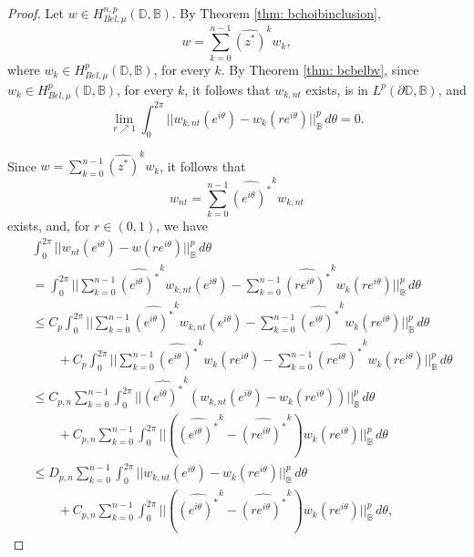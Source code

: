 \documentclass[10pt,a4paper]{amsart}
\newcommand{\bc}{\mathbb{B}}
\newcommand{\disk}{\mathbb{D}}
\newcommand{\p}{\partial}
\begin{document}
\begin{proof}




 Let $w \in H^{n,p}_{Bel,\mu}(\disk,\bc)$. By Theorem \ref{thm: bchoibinclusion}, 
        \[
            w = \sum_{k = 0}^{n-1}  \widehat{(z^*)}^k w_k,
        \]
        where $w_k \in H^p_{Bel,\mu}(\disk,\bc)$, for every $k$. By Theorem \ref{thm: bcbelbv}, since $w_k \in H^p_{Bel,\mu}(\disk,\bc)$, for every $k$, it follows that $w_{k,nt}$ exists, is in $L^p(\p \disk,\bc)$, and 
        \begin{equation}\label{convfork}
            \lim_{r \nearrow 1} \int_0^{2\pi} ||w_{k,nt}(e^{i\theta}) - w_k(re^{i\theta}) ||^p_{\bc} \, d\theta  = 0. 
        \end{equation}

        Since $w = \sum_{k = 0}^{n-1}  \widehat{(z^*)}^k w_k$, it follows that 
        \[
            w_{nt} = \sum_{k = 0}^{n-1}  \widehat{(e^{i\theta})^*}^k w_{k,nt}
        \]
        exists, and, for $r \in (0,1)$, we have
        \begin{align*}
            &\int_0^{2\pi} ||w_{nt}(e^{i\theta}) - w(re^{i\theta}) ||^p_{\bc} \, d\theta \\
            &= \int_0^{2\pi} ||\sum_{k = 0}^{n-1}  \widehat{(e^{i\theta})^*}^k w_{k,nt}(e^{i\theta}) - \sum_{k = 0}^{n-1}  \widehat{(re^{i\theta})^*}^k w_k(re^{i\theta}) ||^p_{\bc} \, d\theta \\
            &\leq C_p \int_0^{2\pi} ||\sum_{k = 0}^{n-1}  \widehat{(e^{i\theta})^*}^k w_{k,nt}(e^{i\theta}) - \sum_{k = 0}^{n-1}  \widehat{(e^{i\theta})^*}^k w_k(re^{i\theta}) ||^p_{\bc} \, d\theta \\
            &\quad\quad + C_p\int_0^{2\pi} ||\sum_{k = 0}^{n-1}  \widehat{(e^{i\theta})^*}^k w_k(re^{i\theta}) - \sum_{k = 0}^{n-1}  \widehat{(re^{i\theta})^*}^k w_k(re^{i\theta}) ||^p_{\bc} \, d\theta \\
            &\leq C_{p,n} \sum_{k = 0}^{n-1} \int_0^{2\pi} ||  \widehat{(e^{i\theta})^*}^k (w_{k,nt}(e^{i\theta}) - w_k(re^{i\theta})) ||^p_{\bc} \, d\theta \\
            &\quad\quad + C_{p,n} \sum_{k = 0}^{n-1} \int_0^{2\pi}  ||  (\widehat{(e^{i\theta})^*}^k -  \widehat{(re^{i\theta})^*}^k )w_k(re^{i\theta}) ||^p_{\bc} \, d\theta \\
            &\leq D_{p,n} \sum_{k = 0}^{n-1} \int_0^{2\pi} ||  w_{k,nt}(e^{i\theta}) - w_k(re^{i\theta}) ||^p_{\bc} \, d\theta \\
            &\quad\quad + C_{p,n} \sum_{k = 0}^{n-1} \int_0^{2\pi}  ||  (\widehat{(e^{i\theta})^*}^k -  \widehat{(re^{i\theta})^*}^k )w_k(re^{i\theta}) ||^p_{\bc} \, d\theta ,

\end{align*}
\end{proof}
\end{document}

